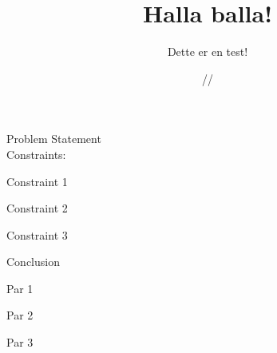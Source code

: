 \documentclass[11pt]{report}
\title{\textbf{Halla balla!}}
\author{Dette er en test!}
\date{\oldstylenums{00}/\oldstylenums{00}/\oldstylenums{00}}
\begin{document}
\maketitle
 
\begin{outline}
	\item Problem Statement \\ Constraints:
    \begin{outline}
    	\item Constraint 1
    	\item Constraint 2
    	\item Constraint 3

	\end{outline}
\end{outline}

\newpage

Conclusion
\par Par 1
\par Par 2
\par Par 3
\end{document}
